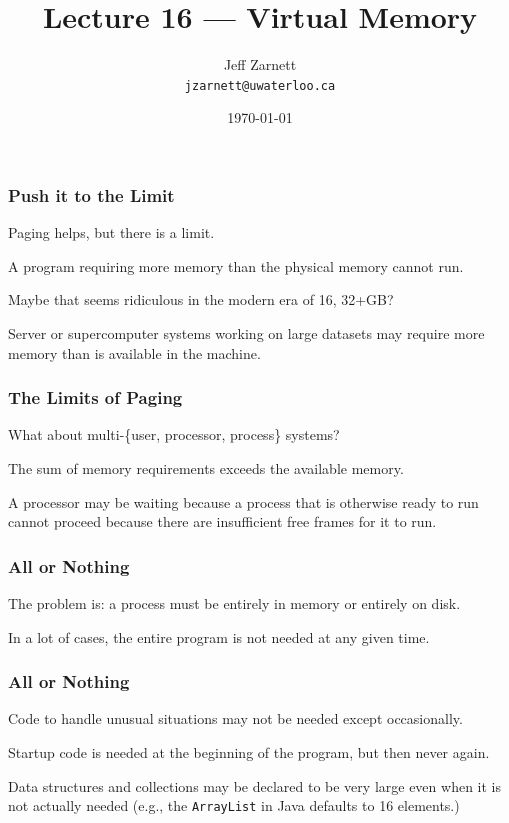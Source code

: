 

\title{Lecture 16 --- Virtual Memory}

\author{Jeff Zarnett \\ \small \texttt{jzarnett@uwaterloo.ca}}
\date{\today}




\begin{frame}
  \titlepage

 \end{frame}



\begin{frame}
\frametitle{Push it to the Limit}

Paging helps, but there is a limit. 

A program requiring more memory than the physical memory cannot run. 

Maybe that seems ridiculous in the modern era of 16, 32+GB?

Server or supercomputer systems working on large datasets may require more memory than is available in the machine.

\end{frame}

\begin{frame}
\frametitle{The Limits of Paging}

What about multi-\{user, processor, process\} systems?

The sum of memory requirements exceeds the available memory. 

A processor may be waiting because a process that is otherwise ready to run cannot proceed because there are insufficient free frames for it to run.

\end{frame}

\begin{frame}
\frametitle{All or Nothing}

The problem is: a process must be entirely in memory or entirely on disk. 

In a lot of cases, the entire program is not needed at any given time. 

\end{frame}

\begin{frame}
\frametitle{All or Nothing}

Code to handle unusual situations may not be needed except occasionally.

 Startup code is needed at the beginning of the program, but then never again. 
 
Data structures and collections may be declared to be very large even when it is not actually needed (e.g., the \texttt{ArrayList} in Java defaults to 16 elements.)

\end{frame}

